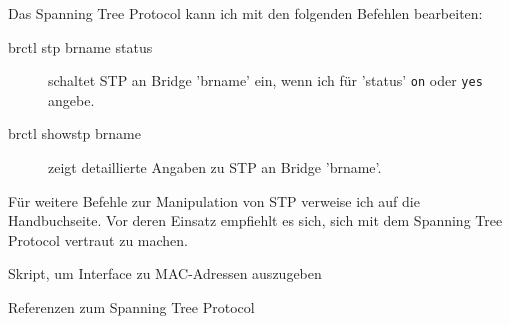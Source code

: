 \begin{normaltext}
  Das Spanning Tree Protocol kann ich mit den folgenden Befehlen bearbeiten:
  \begin{description}
    \item[brctl stp brname status] schaltet STP an Bridge 'brname' ein, wenn
      ich für 'status' \verb?on? oder \verb?yes? angebe.
    \item[brctl showstp brname] zeigt detaillierte Angaben zu STP an Bridge
      'brname'.
  \end{description}
  Für weitere Befehle zur Manipulation von STP verweise ich auf die
  Handbuchseite. Vor deren Einsatz empfiehlt es sich, sich mit dem Spanning
  Tree Protocol vertraut zu machen.
\end{normaltext}
\begin{notes}
\item Skript, um Interface zu MAC-Adressen auszugeben
\item Referenzen zum Spanning Tree Protocol
\end{notes}


